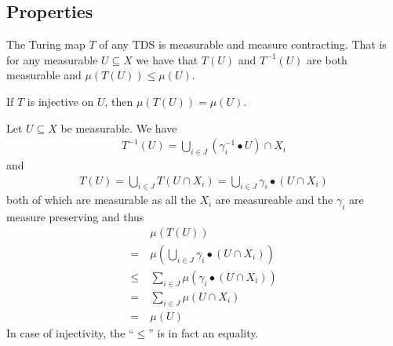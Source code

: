 \subsection{Properties}

\begin{Lemma} \label{tds:lemma_tx_measurable:lemma}
	The Turing map $T$ of any TDS is measurable and measure contracting. That is for any measurable $U \subseteq X$ we have that $T(U)$ and $T^{-1}(U)$ are both measurable and $\mu(T(U)) \leq \mu(U)$.

	If $T$ is injective on $U$, then $\mu(T(U)) = \mu(U)$.
\end{Lemma}
\proof
Let $U \subseteq X$ be measurable. We have
\begin{align*}
	T^{-1}(U) = \bigcup_{i \in J} (\gamma_i^{-1} \bullet U) \cap X_i
\end{align*}
and
\begin{align*}
	T(U) = \bigcup_{i \in J} T(U \cap X_i) = \bigcup_{i \in J} \gamma_i \bullet (U \cap X_i)
\end{align*}
both of which are measurable as all the $X_i$ are measureable and the $\gamma_i$ are measure preserving and thus
\begin{align*}
	  &\mu(T(U)) \\
	=~&\mu(\bigcup_{i \in J} \gamma_i \bullet (U \cap X_i)) \\
	\leq~&\sum_{i \in J} \mu(\gamma_i \bullet (U \cap X_i)) \\
	=~&\sum_{i \in J} \mu(U \cap X_i) \\
	=~&\mu(U)
\end{align*}
In case of injectivity, the ``$\leq$'' is in fact an equality.
\endproof
